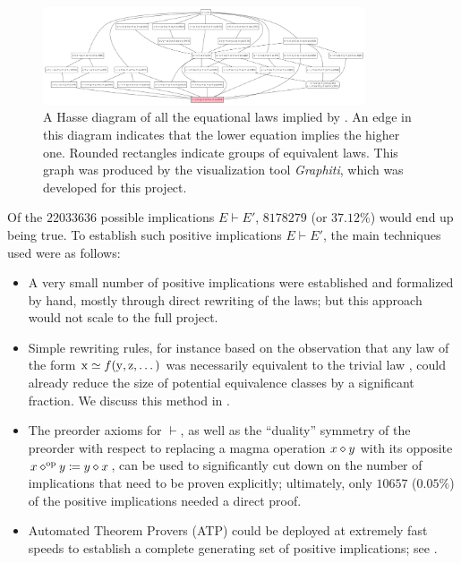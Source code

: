 \begin{figure}
\centering
\includegraphics[width=0.85\textwidth]{854.png}
\caption{A Hasse diagram of all the equational laws implied by .  An edge in this diagram indicates that the lower equation implies the higher one. Rounded rectangles indicate groups of equivalent laws.  This graph was produced by the visualization tool \emph{Graphiti}, which was developed for this project.}
\label{fig:854}
\end{figure}


Of the $22033636$ possible implications $E \vdash E'$, $8178279$ (or $37.12\%$) would end up being true. To establish such positive implications $E \vdash E'$, the main techniques used were as follows:

\begin{itemize}
    \item A very small number of positive implications were established and formalized by hand, mostly through direct rewriting of the laws; but this approach would not scale to the full project.
    \item Simple rewriting rules, for instance based on the observation that any law of the form $\mathrm{x} \simeq f(\mathrm{y},\mathrm{z},\dots)$ was necessarily equivalent to the trivial law , could already reduce the size of potential equivalence classes by a significant fraction. We discuss this method in .
    \item The preorder axioms for $\vdash$, as well as the ``duality'' symmetry of the preorder with respect to replacing a magma operation $x \diamond y$ with its opposite $x \diamond^{\mathrm{op}} y \coloneqq y \diamond x$, can be used to significantly cut down on the number of implications that need to be proven explicitly; ultimately, only $10657$ ($0.05\%$) of the positive implications needed a direct proof.
    \item Automated Theorem Provers (ATP) could be deployed at extremely fast speeds to establish a complete generating set of positive implications; see .
\end{itemize}

